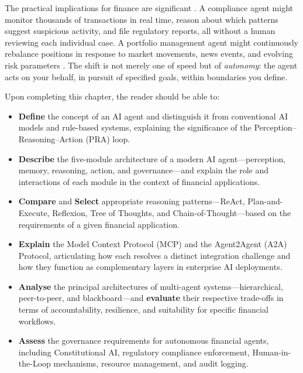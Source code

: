 \documentclass{article}
\begin{document}
The practical implications for finance are significant \cite{rizinski2026ai}. A compliance agent might monitor thousands of transactions in real time, reason about which patterns suggest suspicious activity, and file regulatory reports, all without a human reviewing each individual case. A portfolio management agent might continuously rebalance positions in response to market movements, news events, and evolving risk parameters \cite{lopezprado2018advances}. The shift is not merely one of speed but of \textit{autonomy}: the agent acts on your behalf, in pursuit of specified goals, within boundaries you define.


\begin{learningobjectivesbox}
Upon completing this chapter, the reader should be able to:
\begin{itemize}
  \item \textbf{Define} the concept of an AI agent and distinguish it from conventional AI models and rule-based systems, explaining the significance of the Perception--Reasoning--Action (PRA) loop.
  \item \textbf{Describe} the five-module architecture of a modern AI agent---perception, memory, reasoning, action, and governance---and explain the role and interactions of each module in the context of financial applications.
  \item \textbf{Compare} and \textbf{Select} appropriate reasoning patterns---ReAct, Plan-and-Execute, Reflexion, Tree of Thoughts, and Chain-of-Thought---based on the requirements of a given financial application.
  \item \textbf{Explain} the Model Context Protocol (MCP) and the Agent2Agent (A2A) Protocol, articulating how each resolves a distinct integration challenge and how they function as complementary layers in enterprise AI deployments.
  \item \textbf{Analyse} the principal architectures of multi-agent systems---hierarchical, peer-to-peer, and blackboard---and \textbf{evaluate} their respective trade-offs in terms of accountability, resilience, and suitability for specific financial workflows.
 \item \textbf{Assess} the governance requirements for autonomous financial agents, including Constitutional AI, regulatory compliance enforcement, Human-in-the-Loop mechanisms, resource management, and audit logging.
\end{itemize}
\end{learningobjectivesbox}
\end{document}
